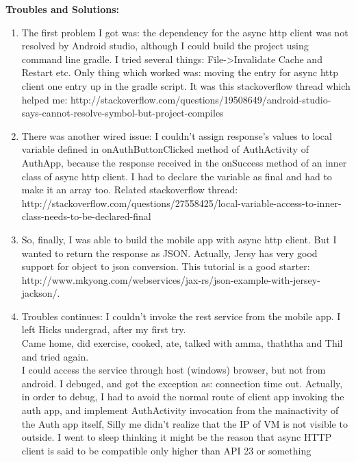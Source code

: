 \documentclass[11pt]{article}
\begin{document}
\textbf{Troubles and Solutions:}
\begin{enumerate}
 \item The first problem I got was: the dependency for the async http client was not resolved by Android studio, although I could build the project 
using command line gradle. I tried several things: File->Invalidate Cache and Restart etc. Only thing which worked was: moving the entry for async 
http client one entry up in the gradle script. It was this stackoverflow thread which helped me: 
http://stackoverflow.com/questions/19508649/android-studio-says-cannot-resolve-symbol-but-project-compiles\\

 \item There was another wired issue: I couldn't assign response's values to local variable defined in onAuthButtonClicked method of AuthActivity of 
AuthApp, because the response received in the onSuccess method of an inner class of async http client. I had to declare the variable as final and had 
to make it an array too. Related stackoverflow thread: 
http://stackoverflow.com/questions/27558425/local-variable-access-to-inner-class-needs-to-be-declared-final

 \item So, finally, I was able to build the mobile app with async http client. But I wanted to return the response as JSON. Actually, Jersy has very 
good support for object to json conversion. This tutorial is a good starter: 
http://www.mkyong.com/webservices/jax-rs/json-example-with-jersey-jackson/.

\item Troubles continues: I couldn't invoke the rest service from the mobile app. I left Hicks undergrad, after my first try. \\
Came home, did exercise, cooked, ate, talked with amma, thaththa and Thil and tried again.\\

I could access the service through host (windows) browser, but not from android. I debuged, and got the exception as: connection time out. Actually, 
in order to debug, I had to avoid the normal route of client app invoking the auth app, and implement AuthActivity invocation from the mainactivity 
of the Auth app itself,
Silly me 
didn't realize that the IP of VM is not visible to outside. I went to sleep thinking it might be the reason that async HTTP client is said to be 
compatible only higher than API 23 or something\\
\end{enumerate}
\end{document}
